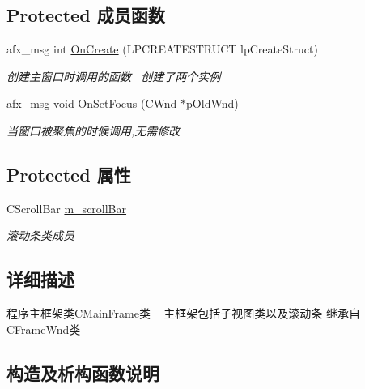 \subsection*{Protected 成员函数}
\begin{DoxyCompactItemize}
\item 
afx\+\_\+msg int \hyperlink{class_c_main_frame_a48666466fd37412fcaeff75c3b12e0ed}{On\+Create} (L\+P\+C\+R\+E\+A\+T\+E\+S\+T\+R\+U\+CT lp\+Create\+Struct)
\begin{DoxyCompactList}\small\item\em 创建主窗口时调用的函数~\newline
创建了两个实例~\newline
\end{DoxyCompactList}\item 
\mbox{\label{class_c_main_frame_adc353a3d1fc497fbc009b6d9e6914a82}} 
afx\+\_\+msg void \hyperlink{class_c_main_frame_adc353a3d1fc497fbc009b6d9e6914a82}{On\+Set\+Focus} (C\+Wnd $\ast$p\+Old\+Wnd)
\begin{DoxyCompactList}\small\item\em 当窗口被聚焦的时候调用,无需修改 \end{DoxyCompactList}\end{DoxyCompactItemize}
\subsection*{Protected 属性}
\begin{DoxyCompactItemize}
\item 
\mbox{\label{class_c_main_frame_afa369311a084e7ff2af17a819829b21b}} 
C\+Scroll\+Bar \hyperlink{class_c_main_frame_afa369311a084e7ff2af17a819829b21b}{m\+\_\+scroll\+Bar}
\begin{DoxyCompactList}\small\item\em 滚动条类成员 \end{DoxyCompactList}\end{DoxyCompactItemize}


\subsection{详细描述}
程序主框架类\+C\+Main\+Frame类 ~\newline
主框架包括子视图类以及滚动条 继承自\+C\+Frame\+Wnd类 

\subsection{构造及析构函数说明}
\mbox{\label{class_c_main_frame_af3e997aeae4148d2aaa4a1e1ae7bdd53}} 
